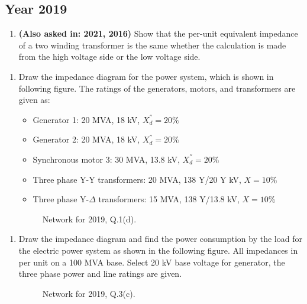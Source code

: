 \documentclass[12pt, a4paper]{article}
\begin{document}
	\subsection{Year 2019}
	\begin{enumerate}[label=\textbf{Q1(b).}, wide, labelindent=0pt]
		\item \textbf{(Also asked in: 2021, 2016)} Show that the per-unit equivalent impedance of a two winding transformer is the same whether the calculation is made from the high voltage side or the low voltage side.
	\end{enumerate}
	\begin{enumerate}[label=\textbf{Q1(d).}, wide, labelindent=0pt]
		\item Draw the impedance diagram for the power system, which is shown in following figure. The ratings of the generators, motors, and transformers are given as:
		\begin{itemize}[noitemsep]
			\item Generator 1: 20 MVA, 18 kV, $X_d^{''} = 20\%$
			\item Generator 2: 20 MVA, 18 kV, $X_d^{''} = 20\%$
			\item Synchronous motor 3: 30 MVA, 13.8 kV, $X_d^{''} = 20\%$
			\item Three phase Y-Y transformers: 20 MVA, 138 Y/20 Y kV, $X = 10\%$
			\item Three phase Y-$\Delta$ transformers: 15 MVA, 138 Y/13.8 kV, $X = 10\%$
		\end{itemize}
		\begin{figure}[h!]
			\centering
			\caption{Network for 2019, Q.1(d).}
		\end{figure}
	\end{enumerate}
	\begin{enumerate}[label=\textbf{Q3(c).}, wide, labelindent=0pt]
		\item Draw the impedance diagram and find the power consumption by the load for the electric power system as shown in the following figure. All impedances in per unit on a 100 MVA base. Select 20 kV base voltage for generator, the three phase power and line ratings are given.
		\begin{figure}[h!]
			\centering
			\caption{Network for 2019, Q.3(c).}
		\end{figure}
	\end{enumerate}
	
\end{document}
